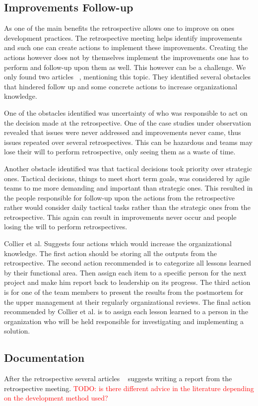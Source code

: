 \documentclass[12pt]{article}
\newcommand\todo[1]{\textcolor{red}{#1}}
\begin{document}
\subsection{Improvements Follow-up}
As one of the main benefits the retrospective allows one to improve on ones development practices. The retrospective meeting helps identify improvements and such one can create actions to implement these improvements. Creating the actions however does not by themselves implement the improvements one has to perform and follow-up upon them as well. This however can be a challenge. We only found two articles ~\cite{Drury2012, Collier1996}, mentioning this topic. They identified several obstacles that hindered follow up and some concrete actions to increase organizational knowledge. 

One of the obstacles identified was uncertainty of who was responsible to act on the decision made at the retrospective. One of the case studies under observation revealed that issues were never addressed and improvements never came, thus issues repeated over several retrospectives. This can be hazardous and teams may lose their will to perform retrospective, only seeing them as a waste of time. 

Another obstacle identified was that tactical decisions took priority over strategic ones. Tactical decisions, things to meet short term goals, was considered by agile teams to me more demanding and important than strategic ones. This resulted in the people responsible for follow-up upon the actions from the retrospective rather would consider daily tactical tasks rather than the strategic ones from the retrospective. This again can result in improvements never occur and people losing the will to perform retrospectives. 

Collier et al. Suggests four actions which would increase the organizational knowledge. The first action should be storing all the outputs from the retrospective. The second action recommended is to categorize all lessons learned by their functional area. Then assign each item to a specific person for the next project and make him report back to leadership on its progress. The third action is for one of the team members to present the results from the postmortem for the upper management at their regularly organizational reviews. The final action recommended by Collier et al. is to assign each lesson learned to a person in the organization who will be held responsible for investigating and implementing a solution. 

\subsection{Documentation}
After the retrospective several articles ~\cite{Dingsoyr2005, Moe2001, Hanssen2003, Collier1996} suggests writing a report from the retrospective meeting. \todo{TODO: is there different advice in the literature depending on the development method used?}
\end{document}

